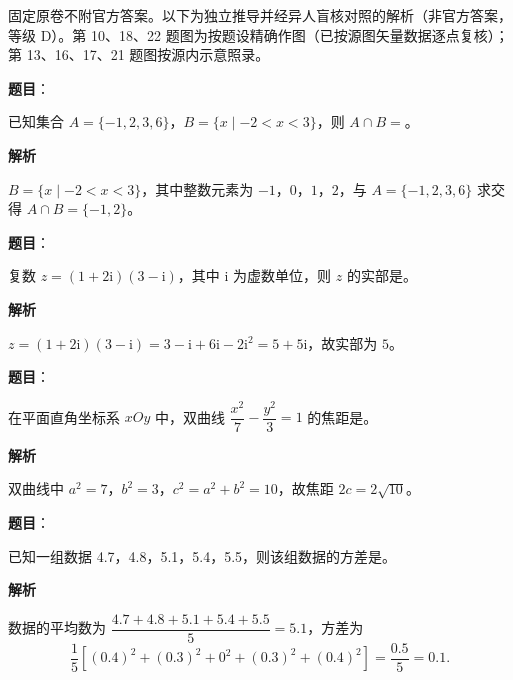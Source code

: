 

\begin{gktip}
固定原卷不附官方答案。以下为独立推导并经异人盲核对照的解析（非官方答案，等级 D）。第 10、18、22 题图为按题设精确作图（已按源图矢量数据逐点复核）；第 13、16、17、21 题图按源内示意照录。
\end{gktip}

\begin{answer}

\textbf{题目}：

已知集合 \(A=\{-1,2,3,6\}\)，\(B=\{x\mid-2<x<3\}\)，则 \(A\cap B=\)\gkblank{}。

\textbf{解析}

\(B=\{x\mid-2<x<3\}\)，其中整数元素为 \(-1\)，\(0\)，\(1\)，\(2\)，与 \(A=\{-1,2,3,6\}\) 求交得 \(A\cap B=\{-1,2\}\)。


\end{answer}
\begin{answer}

\textbf{题目}：

复数 \(z=(1+2\mathrm{i})(3-\mathrm{i})\)，其中 \(\mathrm{i}\) 为虚数单位，则 \(z\) 的实部是\gkblank{}。

\textbf{解析}

\(z=(1+2\mathrm{i})(3-\mathrm{i})=3-\mathrm{i}+6\mathrm{i}-2\mathrm{i}^{2}=5+5\mathrm{i}\)，故实部为 \(5\)。


\end{answer}
\begin{answer}

\textbf{题目}：

在平面直角坐标系 \(xOy\) 中，双曲线 \(\dfrac{x^{2}}{7}-\dfrac{y^{2}}{3}=1\) 的焦距是\gkblank{}。

\textbf{解析}

双曲线中 \(a^{2}=7\)，\(b^{2}=3\)，\(c^{2}=a^{2}+b^{2}=10\)，故焦距 \(2c=2\sqrt{10}\)。


\end{answer}
\begin{answer}

\textbf{题目}：

已知一组数据 4.7，4.8，5.1，5.4，5.5，则该组数据的方差是\gkblank{}。

\textbf{解析}

数据的平均数为 \(\dfrac{4.7+4.8+5.1+5.4+5.5}{5}=5.1\)，方差为
\nopagebreak[4]
\[
\frac{1}{5}\left[(0.4)^{2}+(0.3)^{2}+0^{2}+(0.3)^{2}+(0.4)^{2}\right]=\frac{0.5}{5}=0.1.
\]


\end{answer}
